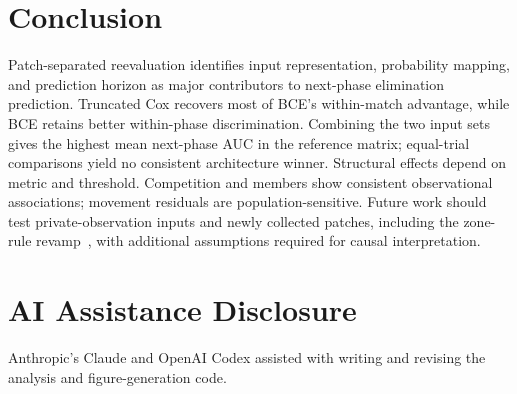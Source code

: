 \documentclass[sigconf,anonymous,nonacm]{acmart}
\begin{document}
\section{Conclusion}
\label{sec:conclusion}
Patch-separated reevaluation identifies input representation, probability mapping, and prediction horizon as major contributors to next-phase elimination prediction. Truncated Cox recovers most of BCE's within-match advantage, while BCE retains better within-phase discrimination. Combining the two input sets gives the highest mean next-phase AUC in the reference matrix; equal-trial comparisons yield no consistent architecture winner. Structural effects depend on metric and threshold. Competition and members show consistent observational associations; movement residuals are population-sensitive. Future work should test private-observation inputs and newly collected patches, including the zone-rule revamp~\cite{PUBGBlueZone2026}, with additional assumptions required for causal interpretation.

\section*{AI Assistance Disclosure}
Anthropic's Claude and OpenAI Codex assisted with writing and revising the analysis and figure-generation code.



\end{document}
